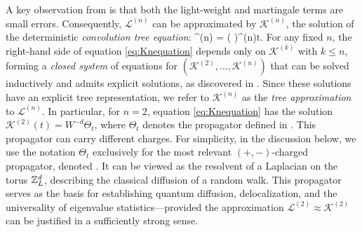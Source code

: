 A key observation from \cite{YY_25, DYYY25} is that both the light-weight and martingale terms are small errors. Consequently, \( \mathcal{L}^{(n)} \) can be approximated by \( \mathcal{K}^{(n)} \), the solution of the deterministic \emph {convolution tree  equation}: 
\be\label{eq:Knequation}
\dd {}^{(n)} = ( \ast {})^{(n)}\dd t.
\ee
For any fixed \( n \), the right-hand side of equation \eqref{eq:Knequation} depends only on \( \mathcal{K}^{(k)} \) with \( k \leq n \), forming a \emph{closed system} of equations for \( (\mathcal{K}^{(2)}, \ldots, \mathcal{K}^{(n)}) \) that can be solved inductively and admits explicit solutions, as discovered in \cite{YY_25}. Since these solutions have an explicit tree representation, we refer to \( \mathcal{K}^{(n)} \) as the \emph {tree approximation} to \( \mathcal{L}^{(n)} \). 
In particular, for \( n = 2 \), equation \eqref{eq:Knequation} has the solution \( \mathcal{K}^{(2)}(t) = W^{-d} \Theta_t\), where $\Theta_t$ denotes the propagator defined in . 
This propagator can carry different charges. For simplicity, in the discussion below, we use the notation $\Theta_t$ exclusively for the most relevant $(+,-)$-charged propagator, denoted . It can be viewed as the resolvent of a Laplacian on the torus ${\mathbb Z}_L^d$,  describing the classical diffusion of a random walk. 
This propagator serves as the basis for establishing quantum diffusion, delocalization, and the universality of eigenvalue statistics---provided the approximation \( \mathcal{L}^{(2)} \approx \mathcal{K}^{(2)} \) can be justified in a sufficiently strong sense.

